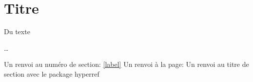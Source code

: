 \section{Titre}\label{etiquette}

Du texte

…

Un renvoi au numéro de section: \ref{label}
Un renvoi à la page: \pageref{label}
Un renvoi au titre de section
avec le package hyperref
